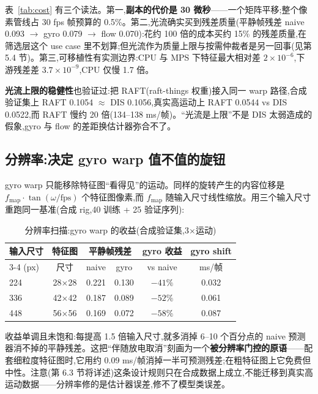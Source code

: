 \documentclass[UTF8,12pt,a4paper]{ctexart}
\begin{document}
表~\ref{tab:cost} 有三个读法。第一,\textbf{副本的代价是 30 微秒}——一个矩阵平移;整个像素管线占 30 fps 帧预算的 0.5\%。第二,光流确实买到残差质量(平静帧残差 naive 0.093 $\to$ gyro 0.079 $\to$ flow 0.070):花约 100 倍的成本买约 15\% 的残差质量,在筛选层这个 use case 里不划算;但光流作为质量上限与按需仲裁者是另一回事(见第 5.4 节)。第三,可移植性有实测边界:CPU 与 MPS 下特征最大相对差 $2{\times}10^{-6}$,下游残差差 $3.7{\times}10^{-9}$,CPU 仅慢 1.7 倍。

\textbf{光流上限的稳健性}也验证过:把 RAFT\cite{raft2020}(raft-things 权重)接入同一 warp 路径,合成验证集上 RAFT 0.1054 $\approx$ DIS 0.1056,真实高运动上 RAFT 0.0544 vs DIS 0.0522,而 RAFT 慢约 20 倍(134--138 ms/帧)。``光流是上限''不是 DIS 太弱造成的假象,gyro 与 flow 的差距换估计器弥合不了。

\subsection{分辨率:决定 gyro warp 值不值的旋钮}

gyro warp 只能移除特征图``看得见''的运动。同样的旋转产生的内容位移是 $f_{\mathrm{map}} \cdot \tan(\omega / \mathrm{fps})$ 个特征图像素,而 $f_{\mathrm{map}}$ 随输入尺寸线性缩放。用三个输入尺寸重跑同一基准(合成 rig,40 训练 + 25 验证序列):

\begin{table}[htbp]
  \centering
  \small
  \caption{分辨率扫描:gyro warp 的收益(合成验证集,3$\times$运动)}
  \label{tab:resolution}
  \begin{tabular}{lccccc}
    \toprule
    输入尺寸 & 特征图 & \multicolumn{2}{c}{平静帧残差} & gyro 收益 & gyro shift \\
    \cmidrule(lr){3-4}
    (px) & 尺寸 & naive & gyro & vs naive & ms/帧 \\
    \midrule
    224 & 28$\times$28 & 0.221 & 0.130 & $-41\%$ & 0.032 \\
    336 & 42$\times$42 & 0.187 & 0.089 & $-52\%$ & 0.061 \\
    448 & 56$\times$56 & 0.169 & 0.072 & $-58\%$ & 0.087 \\
    \bottomrule
  \end{tabular}
\end{table}

收益单调且未饱和:每提高 1.5 倍输入尺寸,就多消掉 6--10 个百分点的 naive 预测器消不掉的平静残差。这把``伴随放电取消''刻画为一个\textbf{被分辨率门控的原语}——配套细粒度特征图时,它用约 0.09 ms/帧消掉一半可预测残差;在粗特征图上它免费但中性。注意(第 6.3 节将详述)这条设计规则只在合成数据上成立,不能迁移到真实高运动数据——分辨率修的是估计器误差,修不了模型类误差。
\end{document}
